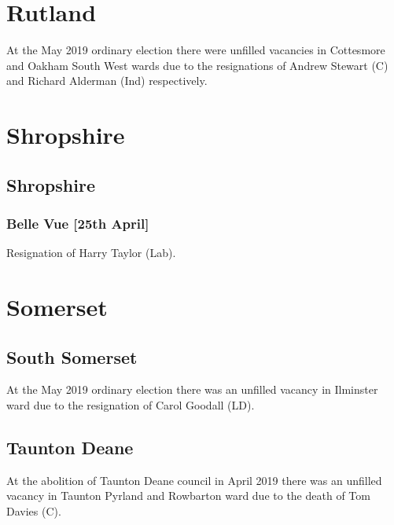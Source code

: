 \documentclass[a4paper,openany]{book}
\begin{document}
\begin{resultsiii}
\section{Rutland}

At the May 2019 ordinary election there were unfilled vacancies in Cottesmore and Oakham South West wards due to the resignations of Andrew Stewart (C) and Richard Alderman (Ind) respectively.

\section{Shropshire}

\subsection*{Shropshire}

\subsubsection*{Belle Vue \hspace*{\fill}\nolinebreak[1]%
	\enspace\hspace*{\fill}
	[25th April]}


Resignation of Harry Taylor (Lab).

\section{Somerset}

\subsection*{South Somerset}

At the May 2019 ordinary election there was an unfilled vacancy in Ilminster ward due to the resignation of Carol Goodall (LD).

\subsection*{Taunton Deane}

At the abolition of Taunton Deane council in April 2019 there was an unfilled vacancy in Taunton Pyrland and Rowbarton ward due to the death of Tom Davies (C).


\end{resultsiii}
\end{document}

